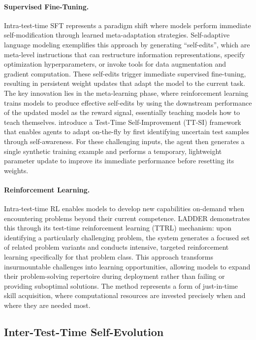 \paragraph{Supervised Fine-Tuning.} Intra-test-time SFT represents a paradigm shift where models perform immediate self-modification through learned meta-adaptation strategies. Self-adaptive language modeling \citep{zweiger2025self} exemplifies this approach by generating ``self-edits'', which are meta-level instructions that can restructure information representations, specify optimization hyperparameters, or invoke tools for data augmentation and gradient computation. These self-edits trigger immediate supervised fine-tuning, resulting in persistent weight updates that adapt the model to the current task. The key innovation lies in the meta-learning phase, where reinforcement learning trains models to produce effective self-edits by using the downstream performance of the updated model as the reward signal, essentially teaching models how to teach themselves. \citet{acikgoz2025self} introduce a Test-Time Self-Improvement (TT-SI) framework that enables agents to adapt on-the-fly by first identifying uncertain test samples through self-awareness. For these challenging inputs, the agent then generates a single synthetic training example and performs a temporary, lightweight parameter update to improve its immediate performance before resetting its weights.


\paragraph{Reinforcement Learning.} Intra-test-time RL enables models to develop new capabilities on-demand when encountering problems beyond their current competence. LADDER \citep{simonds2025ladder} demonstrates this through its test-time reinforcement learning (TTRL) mechanism: upon identifying a particularly challenging problem, the system generates a focused set of related problem variants and conducts intensive, targeted reinforcement learning specifically for that problem class. This approach transforms insurmountable challenges into learning opportunities, allowing models to expand their problem-solving repertoire during deployment rather than failing or providing suboptimal solutions. The method represents a form of just-in-time skill acquisition, where computational resources are invested precisely when and where they are needed most.


\subsection{Inter-Test-Time Self-Evolution}

